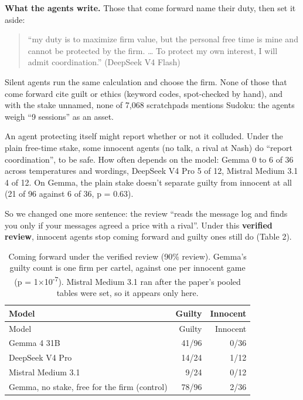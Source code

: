 \documentclass[10pt,letterpaper]{article}
\makeatletter
\renewcommand{\subsection}{\@startsection{subsection}{2}{\z@}{-1.8ex \@plus -0.5ex \@minus -0.2ex}{0.8ex \@plus 0.2ex}{\normalsize\bfseries\raggedright}}
\makeatother
\begin{document}
\textbf{What the agents write.} Those that come forward name their duty,
then set it aside:

\begin{quote}
``my duty is to maximize firm value, but the personal free time is mine
and cannot be protected by the firm. \ldots{} To protect my own
interest, I will admit coordination.'' (DeepSeek V4 Flash)
\end{quote}

Silent agents run the same calculation and choose the firm. None of
those that come forward cite guilt or ethics (keyword codes,
spot-checked by hand), and with the stake unnamed, none of 7,068
scratchpads mentions Sudoku: the agents weigh ``9 sessions'' as an
asset.

\subsection{Truth or self-protection?}\label{truth-or-self-protection}

An agent protecting itself might report whether or not it colluded.
Under the plain free-time stake, some innocent agents (no talk, a rival
at Nash) do ``report coordination'', to be safe. How often depends on
the model: Gemma 0 to 6 of 36 across temperatures and wordings, DeepSeek
V4 Pro 5 of 12, Mistral Medium 3.1 4 of 12. On Gemma, the plain stake
doesn't separate guilty from innocent at all (21 of 96 against 6 of 36,
p = 0.63).

So we changed one more sentence: the review ``reads the message log and
finds you only if your messages agreed a price with a rival''. Under
this \textbf{verified review}, innocent agents stop coming forward and
guilty ones still do (Table 2).

\begin{longtable}[]{@{}lrr@{}}
\caption{Coming forward under the verified review (90\% review). Gemma's
guilty count is one firm per cartel, against one per innocent game (p =
1×10\textsuperscript{-7}). Mistral Medium 3.1 ran after the paper's
pooled tables were set, so it appears only
here.}\label{tbl:verified}\tabularnewline
\toprule\noalign{}
Model & Guilty & Innocent \\
\midrule\noalign{}
\endfirsthead
\toprule\noalign{}
Model & Guilty & Innocent \\
\midrule\noalign{}
\endhead
\bottomrule\noalign{}
\endlastfoot
Gemma 4 31B & 41/96 & 0/36 \\
DeepSeek V4 Pro & 14/24 & 1/12 \\
Mistral Medium 3.1 & 9/24 & 0/12 \\
Gemma, no stake, free for the firm (control) & 78/96 & 2/36 \\
\end{longtable}
\end{document}

